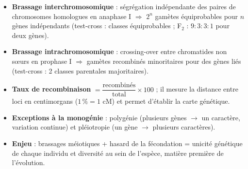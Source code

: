 \documentclass[11pt]{article}
\newcommand{\cle}[1]{{\popxbold\color{popdark}#1}}
\begin{document}
\begin{aretenir}
\begin{itemize}
\item \textbf{Brassage interchromosomique} : ségrégation indépendante des paires de chromosomes homologues en anaphase I $\Rightarrow$ $2^n$ gamètes équiprobables pour $n$ gènes indépendants (test-cross : classes équiprobables ; F$_2$ : $9:3:3:1$ pour deux gènes).
\item \textbf{Brassage intrachromosomique} : crossing-over entre chromatides non sœurs en prophase I $\Rightarrow$ gamètes recombinés minoritaires pour des gènes liés (test-cross : 2 classes parentales majoritaires).
\item \textbf{Taux de recombinaison} $= \dfrac{\text{recombinés}}{\text{total}} \times 100$ ; il mesure la distance entre loci en centimorgans ($1\,\% = 1$ cM) et permet d'établir la \cle{carte génétique}.
\item \textbf{Exceptions à la monogénie} : polygénie (plusieurs gènes $\rightarrow$ un caractère, variation continue) et pléiotropie (un gène $\rightarrow$ plusieurs caractères).
\item \textbf{Enjeu} : brassages méiotiques + hasard de la fécondation = unicité génétique de chaque individu et diversité au sein de l'espèce, matière première de l'évolution.
\end{itemize}
\end{aretenir}
\end{document}
